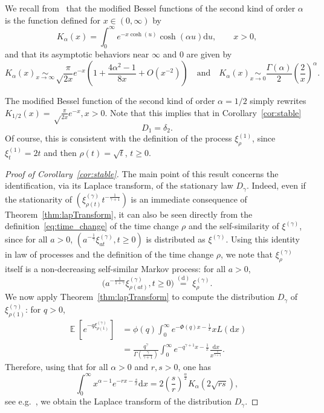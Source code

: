 \documentclass[AHL,Unicode,longabstracts,published]{cedram}
\DeclareMathOperator{\E}{\mathbb{E}}
\newcommand{\dd}{\mathrm{d}}
\begin{document}
We recall from~\cite[Chapter~9.6]{handbook} that the modified Bessel functions of the second kind of order $\alpha$ is the function defined for $x \in (0,\infty)$ by
\begin{equation*}\label{K_int}
K_{\alpha}(x) = \int_0^{\infty} e^{-x \cosh(u)}\cosh(\alpha u) \dd u, \qquad x>0,
\end{equation*}
and that its asymptotic behaviors near $\infty$ and $0$ are given by
\[
K_{\alpha}(x) \underset{x \to \infty}{\sim} \sqrt \frac{\pi }{2x}e^{-x}\left(1+\frac{4 \alpha^2-1}{8x}+O(x^{-2}) \right) \quad \text{and} \quad K_{\alpha}(x) \underset{x \to 0}{\sim} \frac{\Gamma(\alpha)}{2} \left(\frac{2}{x} \right)^{\alpha}.
\]


\begin{rema}
The modified Bessel function of the second kind of order $\alpha=1/2$ simply rewrites $K_{1/2}(x) = \sqrt \frac{\pi }{2x}e^{-x},x>0$. Note that this implies that in Corollary~\ref{cor:stable}
\[
D_1=\delta_{2}.
\]
Of course, this is consistent with the definition of the process $\xi^{(1)}_{\rho}$, since $\xi^{(1)}_t = 2t$ and then $\rho(t)=\sqrt t$, $t\geq 0$.
\end{rema}


\begin{proof}[Proof of Corollary~\ref{cor:stable}]
The main point of this result concerns the identification, via its Laplace transform, of the stationary law $D_{\gamma}$. Indeed, even if the stationarity of $(\xi^{(\gamma)}_{\rho(t)}{t^{-\frac{1}{\gamma+1}}})$ is an immediate consequence of Theorem~\ref{thm:lapTransform}, it can also be seen directly from the definition~\eqref{eq:time_change} of the time change $\rho$ and the self-similarity of $\xi^{(\gamma)}$, since for all $a>0$, $(a^{-\frac{1}{\gamma}} \xi^{(\gamma)}_{at},t\geq 0)$ is distributed as $\xi^{(\gamma)}$. Using this identity in law of processes and the definition of the time change $\rho$, we note that $\xi^{(\gamma)}_{\rho}$ itself is a non-decreasing self-similar Markov process: for all $a>0$,
\[
\Big(a^{-\frac{1}{1+\gamma}} \xi^{(\gamma)}_{\rho(at)},t\geq 0 \Big) \overset{\mathrm{(d)}} = \xi^{(\gamma)}_{\rho}.
\]
We now apply Theorem~\ref{thm:lapTransform} to compute the distribution $D_{\gamma}$ of $\xi^{(\gamma)}_{\rho(1)}$: for $q>0$,
\begin{align*}
\E\left[e^{-q \xi^{(\gamma)}_{\rho(1)}} \right] &= \phi(q)\int_0^{\infty} e^{-\Phi(q)x-\frac{1}{x}} xL(\dd x)\\
&= \frac{q^\gamma }{\Gamma\left(\frac{\gamma}{\gamma+1}\right)} \int_0^\infty e^{-q^{\gamma + 1} x-\frac{1}{x}} \frac{\dd x}{x^{\frac{1}{\gamma + 1}}}.
\end{align*}
Therefore, using that for all $\alpha > 0$ and $r,s > 0$, one has
\begin{equation*}\label{Bessel2}
\int_0^{\infty} x^{\alpha-1} e^{-rx-\frac{s}{x}} \dd x = 2 \left(\frac{s}{r}\right)^{\frac{\alpha}{2}} K_{\alpha} \left(2 \sqrt{rs}\right),
\end{equation*}
see e.g.~\cite{Temme90}, we obtain the Laplace transform of the distribution $D_{\gamma}$.
\end{proof}
\end{document}
